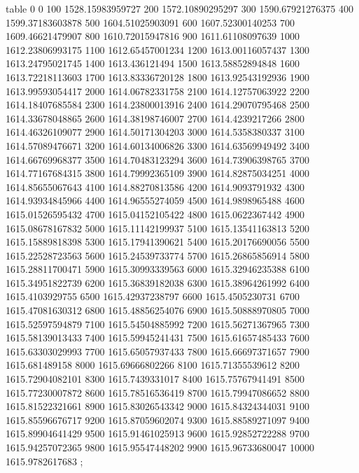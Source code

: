 table {%
0 0
100 1528.15983959727
200 1572.10890295297
300 1590.67921276375
400 1599.37183603878
500 1604.51025903091
600 1607.52300140253
700 1609.46621479907
800 1610.72015947816
900 1611.61108097639
1000 1612.23806993175
1100 1612.65457001234
1200 1613.00116057437
1300 1613.24795021745
1400 1613.436121494
1500 1613.58852894848
1600 1613.72218113603
1700 1613.83336720128
1800 1613.92543192936
1900 1613.99593054417
2000 1614.06782331758
2100 1614.12757063922
2200 1614.18407685584
2300 1614.23800013916
2400 1614.29070795468
2500 1614.33678048865
2600 1614.38198746007
2700 1614.4239217266
2800 1614.46326109077
2900 1614.50171304203
3000 1614.5358380337
3100 1614.57089476671
3200 1614.60134006826
3300 1614.63569949492
3400 1614.66769968377
3500 1614.70483123294
3600 1614.73906398765
3700 1614.77167684315
3800 1614.79992365109
3900 1614.82875034251
4000 1614.85655067643
4100 1614.88270813586
4200 1614.9093791932
4300 1614.93934845966
4400 1614.96555274059
4500 1614.9898965488
4600 1615.01526595432
4700 1615.04152105422
4800 1615.0622367442
4900 1615.08678167832
5000 1615.11142199937
5100 1615.13541163813
5200 1615.15889818398
5300 1615.17941390621
5400 1615.20176690056
5500 1615.22528723563
5600 1615.24539733774
5700 1615.26865856914
5800 1615.28811700471
5900 1615.30993339563
6000 1615.32946235388
6100 1615.34951822739
6200 1615.36839182038
6300 1615.38964261992
6400 1615.4103929755
6500 1615.42937238797
6600 1615.4505230731
6700 1615.47081630312
6800 1615.48856254076
6900 1615.50888970805
7000 1615.52597594879
7100 1615.54504885992
7200 1615.56271367965
7300 1615.58139013433
7400 1615.59945241431
7500 1615.61657485433
7600 1615.63303029993
7700 1615.65057937433
7800 1615.66697371657
7900 1615.681489158
8000 1615.69666802266
8100 1615.71355539612
8200 1615.72904082101
8300 1615.7439331017
8400 1615.75767941491
8500 1615.77230007872
8600 1615.78516536419
8700 1615.79947086652
8800 1615.81522321661
8900 1615.83026543342
9000 1615.84324344031
9100 1615.85596676717
9200 1615.87059602074
9300 1615.88589271097
9400 1615.89904641429
9500 1615.91461025913
9600 1615.92852722288
9700 1615.94257072365
9800 1615.95547448202
9900 1615.96733680047
10000 1615.9782617683
};
